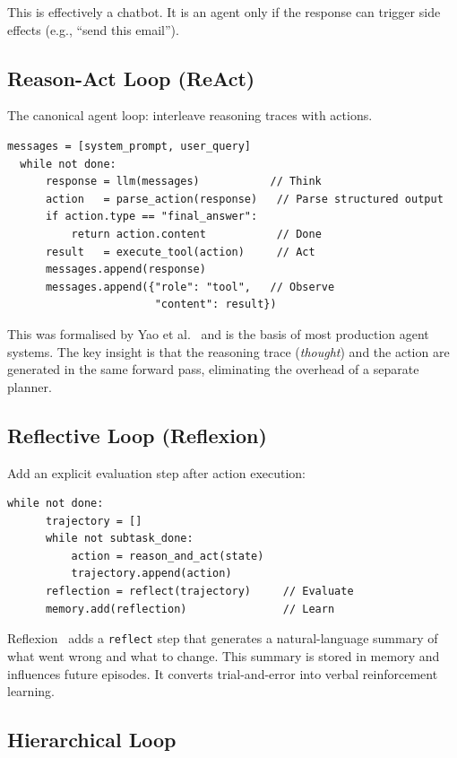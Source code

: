 This is effectively a chatbot. It is an agent only if the response can trigger side effects (e.g., ``send this email'').

\subsection{Reason-Act Loop (ReAct)}

The canonical agent loop: interleave reasoning traces with actions.

\begin{lstlisting}[caption=ReAct-style loop]
  messages = [system_prompt, user_query]
  while not done:
      response = llm(messages)           // Think
      action   = parse_action(response)   // Parse structured output
      if action.type == "final_answer":
          return action.content           // Done
      result   = execute_tool(action)     // Act
      messages.append(response)
      messages.append({"role": "tool",   // Observe
                       "content": result})
\end{lstlisting}

This was formalised by Yao et al.~\cite{yao2023react} and is the basis of most production agent systems. The key insight is that the reasoning trace (\emph{thought}) and the action are generated in the same forward pass, eliminating the overhead of a separate planner.

\subsection{Reflective Loop (Reflexion)}

Add an explicit evaluation step after action execution:

\begin{lstlisting}[caption=Reflexion-style loop]
  while not done:
      trajectory = []
      while not subtask_done:
          action = reason_and_act(state)
          trajectory.append(action)
      reflection = reflect(trajectory)     // Evaluate
      memory.add(reflection)               // Learn
\end{lstlisting}

Reflexion~\cite{shinn2023reflexion} adds a \texttt{reflect} step that generates a natural-language summary of what went wrong and what to change. This summary is stored in memory and influences future episodes. It converts trial-and-error into verbal reinforcement learning.

\subsection{Hierarchical Loop}

